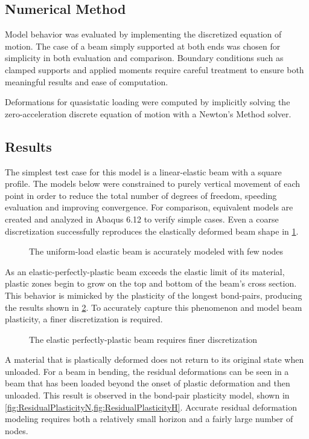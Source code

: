 \documentclass[5p,twocolumn]{elsarticle}
\newcommand{\plotpath}{./plots}
\begin{document}
\subsection{Numerical Method}
\label{sec:NumMethod}
Model behavior was evaluated by implementing the discretized equation of motion.
The case of a beam simply supported at both ends was chosen for simplicity in both evaluation and comparison.
Boundary conditions such as clamped supports and applied moments require careful treatment to ensure both meaningful results and ease of computation.

Deformations for quasistatic loading were computed by implicitly solving the zero-acceleration discrete equation of motion with a Newton's Method solver.
%
\subsection{Results}
\label{sec:Results}
The simplest test case for this model is a linear-elastic beam with a square profile.
The models below were constrained to purely vertical movement of each point in order to reduce the total number of degrees of freedom, speeding evaluation and improving convergence.
For comparison, equivalent models are created and analyzed in Abaqus 6.12 to verify simple cases.
Even a coarse discretization successfully reproduces the elastically deformed beam shape in \cref{fig:elastic_g2000}.

\begin{figure}[h]
  \centering
  \resizebox{\linewidth}{!}{}
  \caption{The uniform-load elastic beam is accurately modeled with few nodes}
  \label{fig:elastic_g2000}
\end{figure}

As an elastic-perfectly-plastic beam exceeds the elastic limit of its material, plastic zones begin to grow on the top and bottom of the beam's cross section.
This behavior is mimicked by the plasticity of the longest bond-pairs, producing the results shown in \cref{fig:eppu_h10_g2000}.
To accurately capture this phenomenon and model beam plasticity, a finer discretization is required.
\begin{figure}[h]
  \centering
  \resizebox{\linewidth}{!}{}
  \caption{The elastic perfectly-plastic beam requires finer discretization}
  \label{fig:eppu_h10_g2000}
\end{figure}

A material that is plastically deformed does not return to its original state when unloaded.
For a beam in bending, the residual deformations can be seen in a beam that has been loaded beyond the onset of plastic deformation and then unloaded.
This result is observed in the bond-pair plasticity model, shown in \cref{fig:ResidualPlasticityN,fig:ResidualPlasticityH}. 
Accurate residual deformation modeling requires both a relatively small horizon and a fairly large number of nodes.
\end{document}
